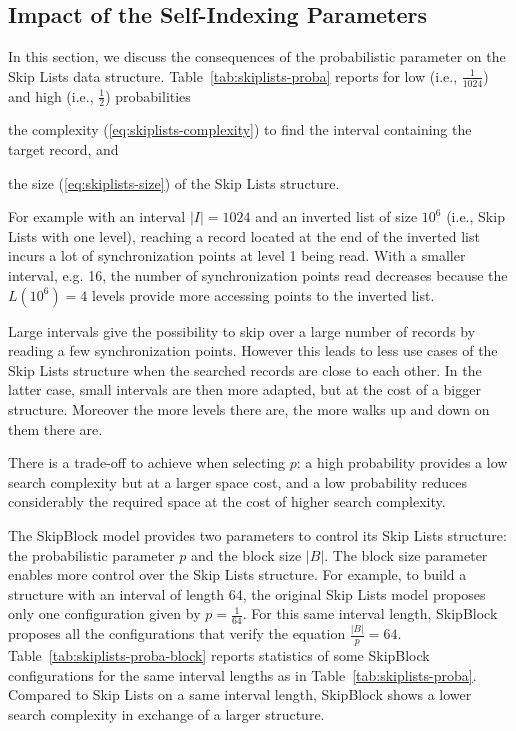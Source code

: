 \subsection{Impact of the Self-Indexing Parameters}
\label{sec:block-probas-impact}

In this section, we discuss the consequences of the probabilistic parameter on
the Skip Lists data structure.
Table~\ref{tab:skiplists-proba} reports for low (i.e., $\frac{1}{1024}$) and
high (i.e., $\frac{1}{2}$) probabilities
\begin{inparaenum}[(1)]
\item the complexity (\ref{eq:skiplists-complexity}) to find the interval
containing the target record, and
\item the size (\ref{eq:skiplists-size}) of the Skip Lists structure.
\end{inparaenum}
For example with an interval $\vert I \vert = 1024$ and an
inverted list of size $10^6$ (i.e., Skip Lists with one level), reaching a record
located at the end of the inverted list incurs a lot of synchronization points
at level 1 being read. With a smaller interval, e.g. 16, the number of
synchronization points read decreases because the $L(10^6)=4$ levels provide
more accessing points to the inverted list.

Large intervals give the possibility to skip over a large number of records by
reading a few synchronization points. However this leads to less use cases of
the Skip Lists structure when the searched records are close to each other. In
the latter case, small intervals are then more adapted, but at the cost of a
bigger structure. Moreover the more levels there are, the more walks up and
down on them there are.

There is a trade-off to achieve when selecting $p$: a high probability
provides a low search complexity but at a larger space cost, and a low
probability reduces considerably the required space at the cost of higher
search complexity.

The SkipBlock model provides two parameters to control its Skip Lists
structure: the probabilistic parameter $p$ and the block size $\vert B \vert$.
The block size parameter enables more control over the Skip Lists structure. For
example, to build a structure with an interval of length 64, the original Skip
Lists model proposes only one configuration given by $p=\frac{1}{64}$. For
this same interval length, SkipBlock proposes all the configurations that
verify the equation $\frac{\vert B \vert}{p}=64$.
Table~\ref{tab:skiplists-proba-block} reports statistics of some SkipBlock
configurations for the same interval lengths as in
Table~\ref{tab:skiplists-proba}. Compared to Skip Lists on a same interval
length, SkipBlock shows a lower search complexity in exchange of a larger
structure.


